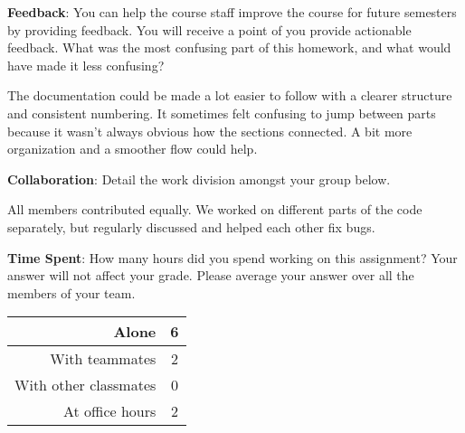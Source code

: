\documentclass[12pt]{article}
\begin{document}
\textbf{Feedback}: You can help the course staff improve the course for future semesters by providing feedback. You will receive a point of you provide actionable feedback. What was the most confusing part of this homework, and what would have made it less confusing?
\begin{solution}[height=4cm, valign=center]
The documentation could be made a lot easier to follow with a clearer structure and consistent numbering. It sometimes felt confusing to jump between parts because it wasn’t always obvious how the sections connected. A bit more organization and a smoother flow could help.
\end{solution}

\textbf{Collaboration}: Detail the work division amongst your group below.
\begin{solution}[height=4cm]

All members contributed equally. We worked on different parts of the code separately, but regularly discussed and helped each other fix bugs. 

\end{solution}

\noindent\textbf{Time Spent}: How many hours did you spend working on this assignment? Your answer will not affect your grade. Please average your answer over all the members of your team.
\begin{solution}[height=4cm]
\begin{table}[H]
    \centering
    \begin{tabular}{r|c}
        Alone &  \hspace{3em} 6
        \\ \hline
        With teammates & \hspace{3em} 2
        \\ \hline
        With other classmates & \hspace{3em} 0
        \\ \hline
        At office hours & \hspace{3em} 2
        \\ \hline
    \end{tabular}
\end{table}
\end{solution}
\end{document}
